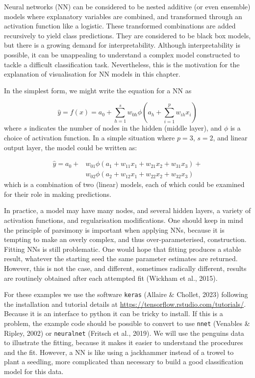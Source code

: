 \documentclass[
  letterpaper,
]{krantz}
\begin{document}

Neural networks (NN) can be considered to be nested additive (or even
ensemble) models where explanatory variables are combined, and
transformed through an activation function like a logistic. These
transformed combinations are added recursively to yield class
predictions. They are considered to be black box models, but there is a
growing demand for interpretability. Although interpretability is
possible, it can be unappealing to understand a complex model
constructed to tackle a difficult classification task. Nevertheless,
this is the motivation for the explanation of visualisation for NN
models in this chapter.

In the simplest form, we might write the equation for a NN as

\[
\hat{y} = f(x) = a_0+\sum_{h=1}^{s}
w_{0h}\phi(a_h+\sum_{i=1}^{p} w_{ih}x_i)
\] where \(s\) indicates the number of nodes in the hidden (middle
layer), and \(\phi\) is a choice of activation function. In a simple
situation where \(p=3\), \(s=2\), and linear output layer, the model
could be written as:

\[
\begin{aligned}
\hat{y} = a_0+ & w_{01}\phi(a_1+w_{11}x_1+w_{21}x_2+w_{31}x_3) +\\
 & w_{02}\phi(a_2+w_{12}x_1+w_{22}x_2+w_{32}x_3)
\end{aligned}
\] which is a combination of two (linear) models, each of which could be
examined for their role in making predictions.

In practice, a model may have many nodes, and several hidden layers, a
variety of activation functions, and regularisation modifications. One
should keep in mind the principle of parsimony is important when
applying NNs, because it is tempting to make an overly complex, and thus
over-parameterised, construction. Fitting NNs is still problematic. One
would hope that fitting produces a stable result, whatever the starting
seed the same parameter estimates are returned. However, this is not the
case, and different, sometimes radically different, results are
routinely obtained after each attempted fit (Wickham et al., 2015).

For these examples we use the software \texttt{keras} (Allaire \&
Chollet, 2023) following the installation and tutorial details at
\url{https://tensorflow.rstudio.com/tutorials/}. Because it is an
interface to python it can be tricky to install. If this is a problem,
the example code should be possible to convert to use \texttt{nnet}
(Venables \& Ripley, 2002) or \texttt{neuralnet} (Fritsch et al., 2019).
We will use the penguins data to illustrate the fitting, because it
makes it easier to understand the procedures and the fit. However, a NN
is like using a jackhammer instead of a trowel to plant a seedling, more
complicated than necessary to build a good classification model for this
data.  
\end{document}
